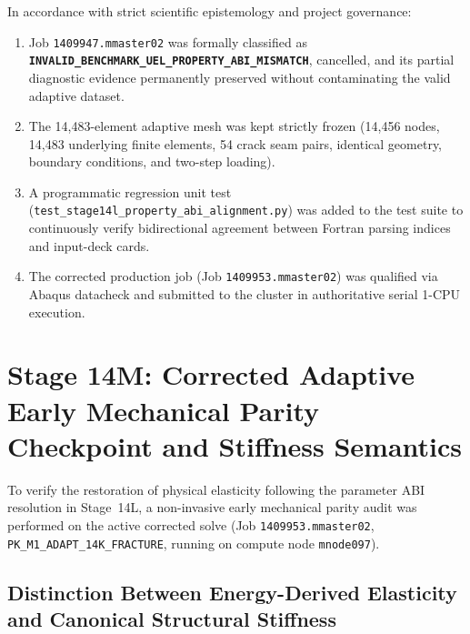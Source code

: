 In accordance with strict scientific epistemology and project governance:
\begin{enumerate}
\item Job \texttt{1409947.mmaster02} was formally classified as \textbf{\texttt{INVALID\_BENCHMARK\_\allowbreak UEL\_PROPERTY\_\allowbreak ABI\_MISMATCH}}, cancelled, and its partial diagnostic evidence permanently preserved without contaminating the valid adaptive dataset.
\item The 14,483-element adaptive mesh was kept strictly frozen (14,456 nodes, 14,483 underlying finite elements, 54 crack seam pairs, identical geometry, boundary conditions, and two-step loading).
\item A programmatic regression unit test (\texttt{test\_stage14l\_\allowbreak property\_abi\_alignment.py}) was added to the test suite to continuously verify bidirectional agreement between Fortran parsing indices and input-deck cards.
\item The corrected production job (Job \texttt{1409953.mmaster02}) was qualified via Abaqus datacheck and submitted to the cluster in authoritative serial 1-CPU execution.
\end{enumerate}

\section{Stage 14M: Corrected Adaptive Early Mechanical Parity Checkpoint and Stiffness Semantics}
\label{sec:stage14m_early_checkpoint}

To verify the restoration of physical elasticity following the parameter ABI resolution in Stage~14L, a non-invasive early mechanical parity audit was performed on the active corrected solve (Job \texttt{1409953.mmaster02}, \texttt{PK\_M1\_ADAPT\_14K\_FRACTURE}, running on compute node \texttt{mnode097}).

\subsection{Distinction Between Energy-Derived Elasticity and Canonical Structural Stiffness}
\label{subsec:k0_semantics}

